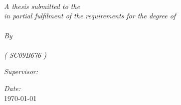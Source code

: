 \documentclass[11pt, oneside]{Thesis} %
\begin{document}
\begin{titlepage}
\begin{center}

\textsc{\Huge \univname}\\[25pt]\\[2.13cm] %
\textsc{\LARGE \facname}\\[20pt]\\[2.13cm] %
\textsc{\Large \deptname}\\[1.0cm] %

\HRule  \\[0.5cm]%
{\huge \bfseries \textit{\ttitle}}\\[0.4cm] %
\HRule \\[1.0cm] %

\Large \textit{A thesis submitted to the \facname \\ in partial fulfilment of the requirements for the degree of \\ \degreename \\ By \\ \authornames \\ \textsc{\textit{( SC09B676 )}} }\\[2.2cm] %
 
\begin{minipage}{0.5\textwidth}
\begin{flushleft} \Large
\emph{Supervisor:}\\
\href{https://plus.google.com/110910335511198809682}{\supname} %
\end{flushleft}
\end{minipage}
\begin{minipage}{0.4\textwidth}
\begin{flushright} \Large
\emph{Date:} \\
\Large \today 
\end{flushright}
\end{minipage}

\end{center}
\end{titlepage}

\end{document}
